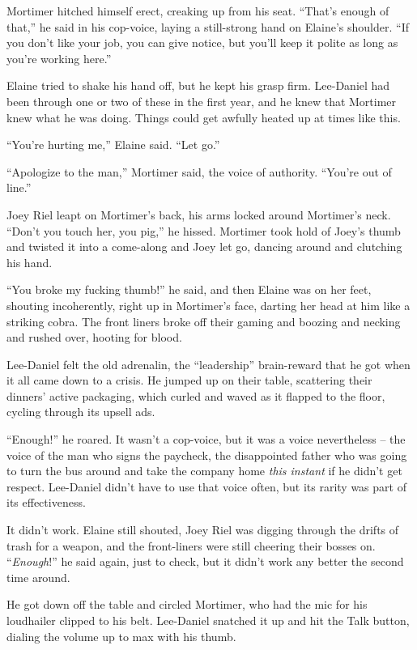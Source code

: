 Mortimer hitched himself erect, creaking up from his seat. “That's 
enough of that,” he said in his cop-voice, laying a still-strong hand 
on Elaine's shoulder. “If you don't like your job, you can give 
notice, but you'll keep it polite as long as you're working here.”

Elaine tried to shake his hand off, but he kept his grasp firm. 
Lee-Daniel had been through one or two of these in the first year, and 
he knew that Mortimer knew what he was doing. Things could get awfully 
heated up at times like this.

“You're hurting me,” Elaine said. “Let go.”

“Apologize to the man,” Mortimer said, the voice of authority. 
“You're out of line.”

Joey Riel leapt on Mortimer's back, his arms locked around Mortimer's 
neck. “Don't you touch her, you pig,” he hissed. Mortimer took hold 
of Joey's thumb and twisted it into a come-along and Joey let go, 
dancing around and clutching his hand.

“You broke my fucking thumb!” he said, and then Elaine was on her 
feet, shouting incoherently, right up in Mortimer's face, darting her 
head at him like a striking cobra. The front liners broke off their 
gaming and boozing and necking and rushed over, hooting for blood.

Lee-Daniel felt the old adrenalin, the “leadership” brain-reward 
that he got when it all came down to a crisis. He jumped up on their 
table, scattering their dinners' active packaging, which curled and 
waved as it flapped to the floor, cycling through its upsell ads.

“Enough!” he roared. It wasn't a cop-voice, but it was a voice 
nevertheless -- the voice of the man who signs the paycheck, the 
disappointed father who was going to turn the bus around and take the 
company home \emph{this instant} if he didn't get respect. Lee-Daniel 
didn't have to use that voice often, but its rarity was part of its 
effectiveness.

It didn't work. Elaine still shouted, Joey Riel was digging through the 
drifts of trash for a weapon, and the front-liners were still cheering 
their bosses on. “\emph{Enough}!” he said again, just to check, but 
it didn't work any better the second time around.

He got down off the table and circled Mortimer, who had the mic for his 
loudhailer clipped to his belt. Lee-Daniel snatched it up and hit the 
Talk button, dialing the volume up to max with his thumb.

